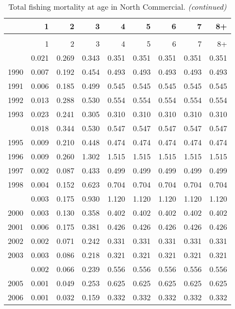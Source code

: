 \documentclass[
]{article}
\begin{document}
\begin{longtable}[t]{lrrrrrrrr}
\caption{\label{tab:North_Commercial-fleet-FAA-table}Total fishing mortality at age in North Commercial.}\\
\toprule
  & 1 & 2 & 3 & 4 & 5 & 6 & 7 & 8+\\
\midrule
\endfirsthead
\caption[]{Total fishing mortality at age in North Commercial. \textit{(continued)}}\\
\toprule
  & 1 & 2 & 3 & 4 & 5 & 6 & 7 & 8+\\
\midrule
\endhead

\endfoot
\bottomrule
\endlastfoot
1989 & 0.021 & 0.269 & 0.343 & 0.351 & 0.351 & 0.351 & 0.351 & 0.351\\
1990 & 0.007 & 0.192 & 0.454 & 0.493 & 0.493 & 0.493 & 0.493 & 0.493\\
1991 & 0.006 & 0.185 & 0.499 & 0.545 & 0.545 & 0.545 & 0.545 & 0.545\\
1992 & 0.013 & 0.288 & 0.530 & 0.554 & 0.554 & 0.554 & 0.554 & 0.554\\
1993 & 0.023 & 0.241 & 0.305 & 0.310 & 0.310 & 0.310 & 0.310 & 0.310\\
\addlinespace
1994 & 0.018 & 0.344 & 0.530 & 0.547 & 0.547 & 0.547 & 0.547 & 0.547\\
1995 & 0.009 & 0.210 & 0.448 & 0.474 & 0.474 & 0.474 & 0.474 & 0.474\\
1996 & 0.009 & 0.260 & 1.302 & 1.515 & 1.515 & 1.515 & 1.515 & 1.515\\
1997 & 0.002 & 0.087 & 0.433 & 0.499 & 0.499 & 0.499 & 0.499 & 0.499\\
1998 & 0.004 & 0.152 & 0.623 & 0.704 & 0.704 & 0.704 & 0.704 & 0.704\\
\addlinespace
1999 & 0.003 & 0.175 & 0.930 & 1.120 & 1.120 & 1.120 & 1.120 & 1.120\\
2000 & 0.003 & 0.130 & 0.358 & 0.402 & 0.402 & 0.402 & 0.402 & 0.402\\
2001 & 0.006 & 0.175 & 0.381 & 0.426 & 0.426 & 0.426 & 0.426 & 0.426\\
2002 & 0.002 & 0.071 & 0.242 & 0.331 & 0.331 & 0.331 & 0.331 & 0.331\\
2003 & 0.003 & 0.086 & 0.218 & 0.321 & 0.321 & 0.321 & 0.321 & 0.321\\
\addlinespace
2004 & 0.002 & 0.066 & 0.239 & 0.556 & 0.556 & 0.556 & 0.556 & 0.556\\
2005 & 0.001 & 0.049 & 0.253 & 0.625 & 0.625 & 0.625 & 0.625 & 0.625\\
2006 & 0.001 & 0.032 & 0.159 & 0.332 & 0.332 & 0.332 & 0.332 & 0.332\\

\end{longtable}
\end{document}
